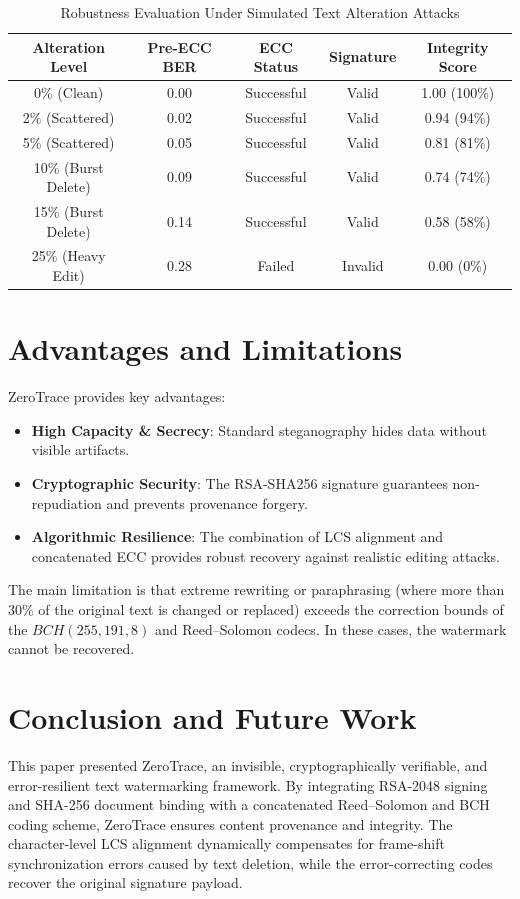 \documentclass[conference]{IEEEtran}
\begin{document}
\begin{table}[htbp]
\caption{Robustness Evaluation Under Simulated Text Alteration Attacks}
\centering
\begin{tabular}{ccccc}
\toprule
\textbf{Alteration Level} & \textbf{Pre-ECC BER} & \textbf{ECC Status} & \textbf{Signature} & \textbf{Integrity Score} \\
\midrule
0\% (Clean) & 0.00 & Successful & Valid & 1.00 (100\%) \\
2\% (Scattered) & 0.02 & Successful & Valid & 0.94 (94\%) \\
5\% (Scattered) & 0.05 & Successful & Valid & 0.81 (81\%) \\
10\% (Burst Delete) & 0.09 & Successful & Valid & 0.74 (74\%) \\
15\% (Burst Delete) & 0.14 & Successful & Valid & 0.58 (58\%) \\
25\% (Heavy Edit) & 0.28 & Failed & Invalid & 0.00 (0\%) \\
\bottomrule
\end{tabular}
\label{tab:robustness}
\end{table}

\section{Advantages and Limitations}
ZeroTrace provides key advantages:
\begin{itemize}
    \item \textbf{High Capacity \& Secrecy}: Standard steganography hides data without visible artifacts.
    \item \textbf{Cryptographic Security}: The RSA-SHA256 signature guarantees non-repudiation and prevents provenance forgery.
    \item \textbf{Algorithmic Resilience}: The combination of LCS alignment and concatenated ECC provides robust recovery against realistic editing attacks.
\end{itemize}

The main limitation is that extreme rewriting or paraphrasing (where more than 30\% of the original text is changed or replaced) exceeds the correction bounds of the $BCH(255, 191, 8)$ and Reed--Solomon codecs. In these cases, the watermark cannot be recovered.

\section{Conclusion and Future Work}
This paper presented ZeroTrace, an invisible, cryptographically verifiable, and error-resilient text watermarking framework. By integrating RSA-2048 signing and SHA-256 document binding with a concatenated Reed--Solomon and BCH coding scheme, ZeroTrace ensures content provenance and integrity. The character-level LCS alignment dynamically compensates for frame-shift synchronization errors caused by text deletion, while the error-correcting codes recover the original signature payload.
\end{document}
